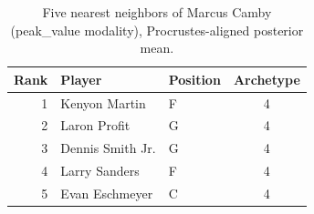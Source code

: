 \begin{table}[htbp]
  \centering\small
  \begin{tabular}{rllc}
    \toprule
    Rank & Player & Position & Archetype \\
    \midrule
    1 & Kenyon Martin & F & 4 \\
    2 & Laron Profit & G & 4 \\
    3 & Dennis Smith Jr. & G & 4 \\
    4 & Larry Sanders & F & 4 \\
    5 & Evan Eschmeyer & C & 4 \\
    \bottomrule
  \end{tabular}
  \caption{Five nearest neighbors of Marcus Camby (peak_value modality), Procrustes-aligned posterior mean.}
  \label{tab:Marcus_Camby_neighbors_peak_value}
\end{table}


